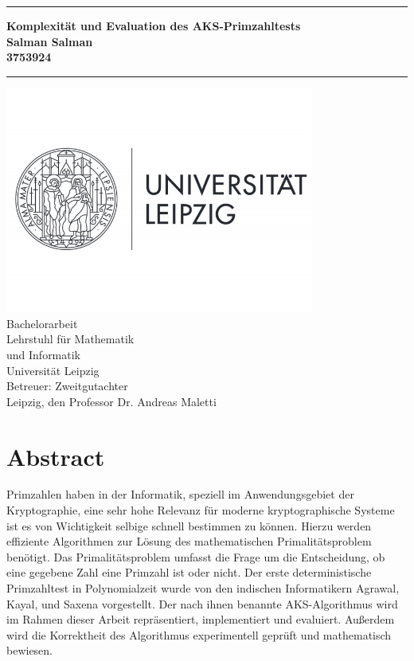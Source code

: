 \documentclass[12pt,oneside]{article}
\theoremstyle{remark}
\theoremstyle{definition}
\newcommand{\JMUTitle}[9]{

  \thispagestyle{empty}
  \vspace*{\stretch{1}}
  {\parindent0cm
  \rule{\linewidth}{.7ex}}
  \begin{flushright}
    \vspace*{\stretch{1}}
    \sffamily\bfseries\Huge
    #1\\
    \vspace*{\stretch{1}}
    \sffamily\bfseries\large
    #2\\
    \vspace*{\stretch{1}}
    \sffamily\bfseries\small
    #3
  \end{flushright}
  \rule{\linewidth}{.7ex}

  \vspace*{\stretch{1}}
  \begin{center}
    \includegraphics[width=4in]{logo} \\
    \vspace*{\stretch{1}}
    \Large  Bachelorarbeit   \\

    \vspace*{\stretch{2}}
   \large Lehrstuhl für Mathematik \\
    \large und Informatik \\
    \large Universität Leipzig\\
    \vspace*{\stretch{1}}
    \large Betreuer:  #8 \\[1mm]
    
    \vspace*{\stretch{1}}
    \large Leipzig, den #7
  \end{center}
}
\begin{document}
  \JMUTitle
      {Komplexität und Evaluation des AKS-Primzahltests  }  
      {Salman Salman}                        
      {3753924}
      
      {Fakultät für Informatik und Mathematik}  %
      {Leipzig 2020}                          %
      {\today}                              %
      {Professor Dr. Andreas Maletti}               %
      {Zweitgutachter}                          %
      
  \clearpage

\lhead{}
    \setcounter{page}{1}

\tableofcontents
\clearpage

\listoffigures

\listoftables
\clearpage

\setlength{\parskip}{0.5em} 


\section*{Abstract}
Primzahlen haben in der Informatik, speziell im Anwendungsgebiet der Kryptographie, eine sehr hohe Relevanz für moderne kryptographische Systeme ist es von Wichtigkeit selbige schnell bestimmen zu können. Hierzu werden effiziente Algorithmen zur Lösung des mathematischen Primalitätsproblem benötigt. Das Primalitätsproblem umfasst die Frage um die Entscheidung, ob eine gegebene Zahl eine Primzahl ist oder nicht. Der erste deterministische Primzahltest in Polynomialzeit wurde von den indischen Informatikern Agrawal, Kayal, und Saxena vorgestellt. Der nach ihnen benannte AKS-Algorithmus wird im Rahmen dieser Arbeit repräsentiert, implementiert und evaluiert. Außerdem wird die Korrektheit des Algorithmus experimentell geprüft und mathematisch bewiesen. 


\clearpage
{}  
    \setcounter{page}{1}
\lhead{\nouppercase{\leftmark}}

\end{document}
